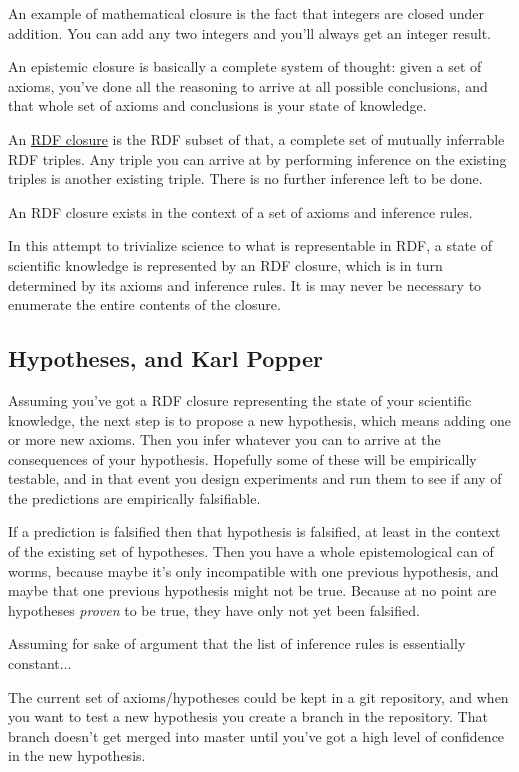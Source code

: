\documentclass{article}
\begin{document}
An example of mathematical closure is the fact that integers are closed under addition.
You can add any two integers and you'll always get an integer result.

An epistemic closure is basically a complete system of thought: given a set of axioms,
you've done all the reasoning to arrive at all possible conclusions, and that whole set
of axioms and conclusions is your state of knowledge.

An \href{https://www.w3.org/TR/2002/WD-rdf-mt-20020214/#rdf_entail}{RDF closure} is
the RDF subset of that, a complete set of mutually inferrable RDF triples. Any triple you
can arrive at by performing inference on the existing triples is another existing triple.
There is no further inference left to be done.

An RDF closure exists in the context of a set of axioms and inference rules.

In this attempt to trivialize science to what is representable in RDF, a state of scientific
knowledge is represented by an RDF closure, which is in turn determined by its axioms and
inference rules. It is may never be necessary to enumerate the entire contents of the
closure.

\subsection{Hypotheses, and Karl Popper}

Assuming you've got a RDF closure representing the state of your scientific knowledge,
the next step is to propose a new hypothesis, which means adding one or more new axioms.
Then you infer whatever you can to arrive at the consequences of your hypothesis. Hopefully
some of these will be empirically testable, and in that event you design experiments and
run them to see if any of the predictions are empirically falsifiable.

If a prediction is falsified then that hypothesis is falsified, at least in the context
of the existing set of hypotheses. Then you have a whole epistemological can of worms,
because maybe it's only incompatible with one previous hypothesis, and maybe that one
previous hypothesis might not be true. Because at no point are hypotheses \textit{proven}
to be true, they have only not yet been falsified.

Assuming for sake of argument that the list of inference rules is essentially constant...

The current set of axioms/hypotheses could be kept in a git repository, and when you
want to test a new hypothesis you create a branch in the repository. That branch doesn't
get merged into master until you've got a high level of confidence in the new hypothesis.
\end{document}

